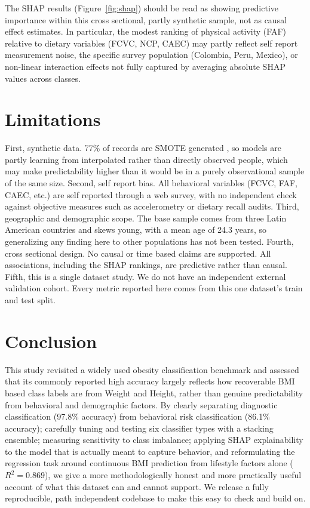 \documentclass[journal]{IEEEtran}
\begin{document}
The SHAP results (Figure~\ref{fig:shap}) should be read as showing predictive importance within this cross sectional, partly synthetic sample, not as causal effect estimates. In particular, the modest ranking of physical activity (FAF) relative to dietary variables (FCVC, NCP, CAEC) may partly reflect self report measurement noise, the specific survey population (Colombia, Peru, Mexico), or non-linear interaction effects not fully captured by averaging absolute SHAP values across classes.

\section{Limitations}
\label{sec:limitations}
First, synthetic data. 77\% of records are SMOTE generated \cite{palechor2019dataset}, so models are partly learning from interpolated rather than directly observed people, which may make predictability higher than it would be in a purely observational sample of the same size. Second, self report bias. All behavioral variables (FCVC, FAF, CAEC, etc.) are self reported through a web survey, with no independent check against objective measures such as accelerometry or dietary recall audits. Third, geographic and demographic scope. The base sample comes from three Latin American countries and skews young, with a mean age of 24.3 years, so generalizing any finding here to other populations has not been tested. Fourth, cross sectional design. No causal or time based claims are supported. All associations, including the SHAP rankings, are predictive rather than causal. Fifth, this is a single dataset study. We do not have an independent external validation cohort. Every metric reported here comes from this one dataset's train and test split.

\section{Conclusion}
\label{sec:conclusion}
This study revisited a widely  used obesity classification benchmark and assessed that its commonly reported high accuracy largely reflects how recoverable BMI based class labels are from Weight and Height, rather than genuine predictability from behavioral and demographic factors. By clearly separating diagnostic classification (97.8\% accuracy) from behavioral risk classification (86.1\% accuracy); carefully tuning and testing six classifier types with a stacking ensemble; measuring sensitivity to class imbalance; applying SHAP explainability to the model that is actually meant to capture behavior, and reformulating the regression task around continuous BMI prediction from lifestyle factors alone ($R^2=0.869$), we give a more methodologically honest and more practically useful account of what this dataset can and cannot support. We release a fully reproducible, path independent codebase to make this easy to check and build on.
\end{document}
